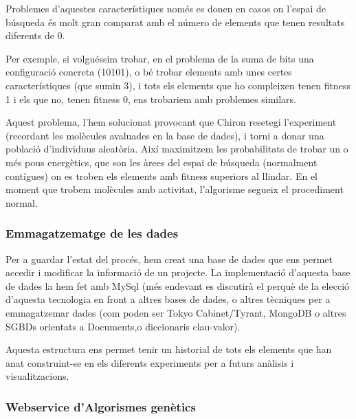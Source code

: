 Problemes d'aquestes característiques només es donen en casos on l'espai de
búsqueda és molt gran comparat amb el número de elements que tenen resultats
diferents de 0.

Per exemple, si volguéssim trobar, en el problema de la suma de bits una
configuració concreta (10101), o bé trobar elements amb unes certes
característiques (que sumin 3), i tots els elements que ho compleixen tenen
fitness 1 i els que no, tenen fitness 0, ens trobariem amb problemes similars.

Aquest problema, l'hem solucionat provocant que Chiron resetegi l'experiment
(recordant les molècules avaluades en la base de dades), i torni a donar una
població d'individuus aleatòria.  Així maximitzem les probabilitats de trobar un
o més pous energètics, que son les àrees del espai de búsqueda (normalment
contígues) on es troben els elements amb fitness superiors al llindar.  En el
moment que trobem molècules amb activitat, l'algorisme segueix el procediment
normal.

\subsubsection{Emmagatzematge de les dades} %
\label{ssub:Emmagatzematge de les dades}

Per a guardar l'estat del procés, hem creat una base de dades que ens permet
accedir i modificar la informació de un projecte.  La implementació d'aquesta
base de dades la hem fet amb MySql (més endevant es discutirà el perquè de la
elecció d'aquesta tecnologia en front a altres bases de dades, o altres
tècniques per a emmagatzemar dades (com poden ser Tokyo Cabinet/Tyrant, MongoDB
o altres SGBDs orientats a Documents,o diccionaris clau-valor).

\lstset{language=sql, tabsize=2}
\lstset{commentstyle=\textit}


Aquesta estructura ens permet tenir un historial de tots els elements que han
anat construint-se en els diferents experiments per a futurs anàlisis i
visualitzacions.

\subsubsection{Webservice d'Algorismes genètics} %
\label{ssub:Webservice d'Algorismes genetics}

